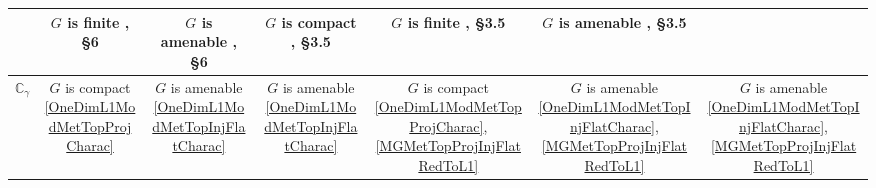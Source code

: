 \documentclass{article}
\theoremstyle{plain}
\theoremstyle{definition}
\begin{document}
\begin{fulltext}
\begin{table}[ht]
\begin{tiny}
\begin{tabular}{|c|c|c|c|c|c|c|}
{			} & 
			\shortstack{
				$G$ is finite \\ \cite{DalPolHomolPropGrAlg}, \S 6
			} & 
			\shortstack{
				$G$ is amenable \\ \cite{DalPolHomolPropGrAlg}, \S 6
			} & 
			\shortstack{
				$G$ is compact \\ \cite{RamsHomPropSemgroupAlg}, \S 3.5
			} & 
			\shortstack{
				$G$ is finite \\ \cite{RamsHomPropSemgroupAlg}, \S 3.5
			} & 
			\shortstack{
				$G$ is amenable \\ \cite{RamsHomPropSemgroupAlg}, \S 3.5
			} \\ 
        \hline
            $\mathbb{C}_\gamma$ & 
			\shortstack{
				$G$ is compact \\ 
				\ref{OneDimL1ModMetTopProjCharac}
			} & 
			\shortstack{
				$G$ is amenable \\ 
				\ref{OneDimL1ModMetTopInjFlatCharac}
			} & 
			\shortstack{
				$G$ is amenable \\ 
				\ref{OneDimL1ModMetTopInjFlatCharac}
			} & 
			\shortstack{
				$G$ is compact \\ 
				\ref{OneDimL1ModMetTopProjCharac},
				\ref{MGMetTopProjInjFlatRedToL1}
			} & 
			\shortstack{
				$G$ is amenable \\ 
				\ref{OneDimL1ModMetTopInjFlatCharac},
				\ref{MGMetTopProjInjFlatRedToL1}
			} & 
			\shortstack{
				$G$ is amenable \\ 
				\ref{OneDimL1ModMetTopInjFlatCharac},
				\ref{MGMetTopProjInjFlatRedToL1}
			} \\                   
        \hline
        \end{tabular}
    \end{tiny}
    \label{HomolTrivModMetTh}
\end{table}


\end{fulltext}
\end{document}
